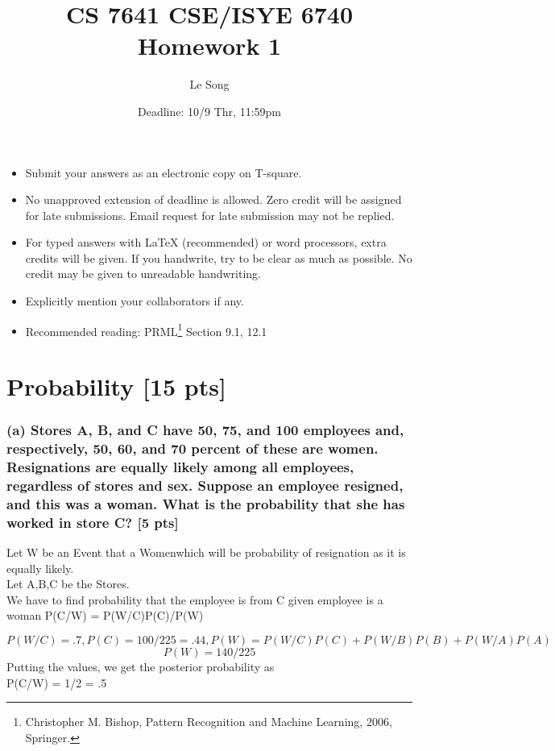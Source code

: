 \documentclass[twoside,10pt]{article}
\begin{document}
\title{CS 7641 CSE/ISYE 6740 Homework 1}
\author{Le Song}
\date{Deadline: 10/9 Thr, 11:59pm}
\maketitle

\begin{itemize}
  \item Submit your answers as an electronic copy on T-square.
  \item No unapproved extension of deadline is allowed. Zero credit will be assigned for late submissions. Email request for late submission may not be replied.
  \item For typed answers with LaTeX (recommended) or word processors, extra credits will be given. If you handwrite, try to be clear as much as possible. No credit may be given to unreadable handwriting.
  \item Explicitly mention your collaborators if any.
  \item Recommended reading: PRML\footnote{Christopher M. Bishop, Pattern Recognition and Machine
Learning, 2006, Springer.} Section 9.1, 12.1
\end{itemize}

\section{Probability [15 pts]}

\subsubsection*{(a) Stores A, B, and C have 50, 75, and 100 employees and, respectively, 50, 60, and 70 percent of these are women. Resignations are equally likely among all employees, regardless of stores and sex. Suppose an employee resigned, and this was a woman. What is the probability that she has worked in store C? [5 pts]}
 Let W be an Event that a Womenwhich will be probability of resignation as it is equally likely.\\[.25cm]
Let A,B,C be  the Stores.\\[.25cm]
We have to find probability that the employee is from C given employee is a woman
P(C/W) = P(W/C)P(C)/P(W)

$$
P(W/C) = .7,
P(C) = 100/225=.44,
P(W) = P(W/C)P(C) + P(W/B)P(B) + P(W/A)P(A) 
$$
$$
P(W)=  140/225
$$
Putting the values, we get the posterior probability as  \\
P(C/W) = 1/2 = .5\\[.55cm]
\end{document}
